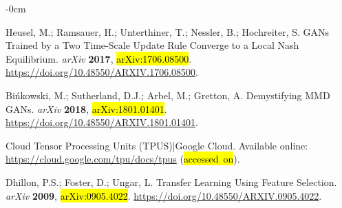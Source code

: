 \documentclass[technologies,article,accept,pdftex,moreauthors]{Definitions/mdpi}
\begin{document}
\begin{adjustwidth}{-\extralength}{0cm}
\begin{thebibliography}{999}
Heusel, M.; Ramsauer, H.; Unterthiner, T.; Nessler, B.; Hochreiter, S.
\newblock GANs Trained by a Two Time-Scale Update Rule Converge to a Local Nash
  Equilibrium. \emph{arXiv} \textbf{2017},  \hl{arXiv:1706.08500}.  
 {\url{https://doi.org/10.48550/ARXIV.1706.08500}}.

Bińkowski, M.; Sutherland, D.J.; Arbel, M.; Gretton, A.
\newblock Demystifying MMD GANs.  \emph{arXiv} \textbf{2018},  \hl{arXiv:1801.01401}.   {\url{https://doi.org/10.48550/ARXIV.1801.01401}}.

Cloud Tensor Processing Units (TPUS)|Google Cloud. Available online: \url{https://cloud.google.com/tpu/docs/tpus} (\hl{accessed~on}). 

Dhillon, P.S.; Foster, D.; Ungar, L.  Transfer Learning Using Feature Selection.  \emph{arXiv} \textbf{2009},  \hl{arXiv:0905.4022}. {\url{https://doi.org/10.48550/ARXIV.0905.4022}}.

\end{thebibliography}

\PublishersNote{}
\end{adjustwidth}
\end{document}
